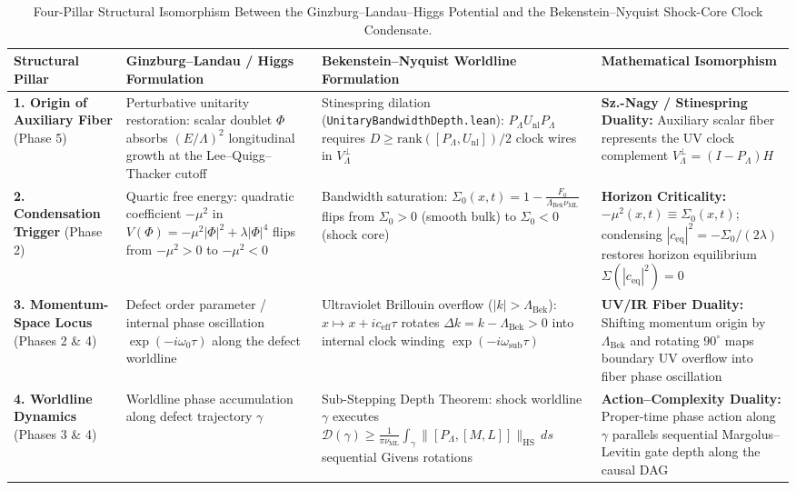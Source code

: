 \documentclass[11pt,a4paper]{article}
\theoremstyle{definition}
\begin{document}
\begin{table}[htbp]
\centering
\caption{Four-Pillar Structural Isomorphism Between the Ginzburg--Landau--Higgs Potential and the Bekenstein--Nyquist Shock-Core Clock Condensate.}
\label{tab:higgs-duality}
\footnotesize
\begin{tabular}{L{2.4cm}L{3.8cm}L{3.9cm}L{3.9cm}}
\toprule
\textbf{Structural Pillar} & \textbf{Ginzburg--Landau / Higgs Formulation~\cite{ginzburg1950,higgs1964,lee1977}} & \textbf{Bekenstein--Nyquist Worldline Formulation} & \textbf{Mathematical Isomorphism} \\
\midrule
\textbf{1. Origin of Auxiliary Fiber} (Phase 5) & Perturbative unitarity restoration: scalar doublet $\Phi$ absorbs $(E/\Lambda)^2$ longitudinal growth at the Lee--Quigg--Thacker cutoff~\cite{lee1977} & Stinespring dilation~\cite{stinespring1955} (\texttt{Unitary\allowbreak{}Bandwidth\allowbreak{}Depth.lean}): $P_{\Lambda} U_{\text{nl}} P_{\Lambda}$ requires $D \ge \mathrm{rank}([P_{\Lambda}, U_{\text{nl}}])/2$ clock wires in $V_{\Lambda}^{\perp}$ & \textbf{Sz.-Nagy / Stinespring Duality:} Auxiliary scalar fiber represents the UV clock complement $V_{\Lambda}^{\perp} = (I - P_{\Lambda})H$ \\
\addlinespace
\textbf{2. Condensation Trigger} (Phase 2) & Quartic free energy: quadratic coefficient $-\mu^2$ in $V(\Phi) = -\mu^2 |\Phi|^2 + \lambda |\Phi|^4$ flips from $-\mu^2 > 0$ to $-\mu^2 < 0$ & Bandwidth saturation: $\Sigma_0(x,t) = 1 - \frac{F_0}{\Lambda_{\text{Bek}}\nu_{\text{ML}}}$ flips from $\Sigma_0 > 0$ (smooth bulk) to $\Sigma_0 < 0$ (shock core) & \textbf{Horizon Criticality:} $-\mu^2(x,t) \equiv \Sigma_0(x,t)$; condensing $|c_{\text{eq}}|^2 = -\Sigma_0/(2\lambda)$ restores horizon equilibrium $\Sigma(|c_{\text{eq}}|^2) = 0$ \\
\addlinespace
\textbf{3. Momentum-Space Locus} (Phases 2 \& 4) & Defect order parameter / internal phase oscillation $\exp(-i\omega_0 \tau)$ along the defect worldline & Ultraviolet Brillouin overflow ($|k| > \Lambda_{\text{Bek}}$): $x \mapsto x + i c_{\text{eff}}\tau$ rotates $\Delta k = k - \Lambda_{\text{Bek}} > 0$ into internal clock winding $\exp(-i\omega_{\text{sub}}\tau)$ & \textbf{UV/IR Fiber Duality:} Shifting momentum origin by $\Lambda_{\text{Bek}}$ and rotating $90^\circ$ maps boundary UV overflow into fiber phase oscillation \\
\addlinespace
\textbf{4. Worldline Dynamics} (Phases 3 \& 4) & Worldline phase accumulation along defect trajectory $\gamma$ & Sub-Stepping Depth Theorem: shock worldline $\gamma$ executes $\mathcal{D}(\gamma) \ge \frac{1}{\pi\nu_{\text{ML}}}\int_{\gamma} \|[P_{\Lambda}, [M, L]]\|_{\text{HS}} \, ds$ sequential Givens rotations & \textbf{Action--Complexity Duality:} Proper-time phase action along $\gamma$ parallels sequential Margolus--Levitin gate depth along the causal DAG \\
\bottomrule
\end{tabular}
\end{table}
\end{document}
